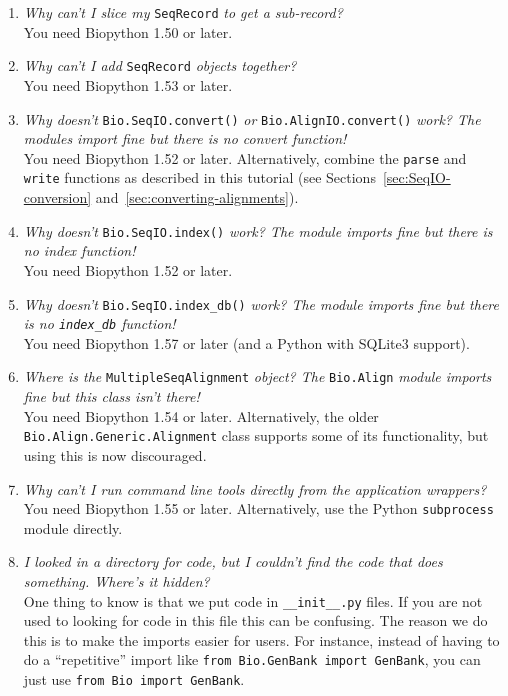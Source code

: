\begin{enumerate}
 \item \emph{Why can't I slice my} \verb|SeqRecord| \emph{to get a sub-record?} \\
  You need Biopython 1.50 or later.

 \item \emph{Why can't I add} \verb|SeqRecord| \emph{objects together?} \\
  You need Biopython 1.53 or later.

  \item \emph{Why doesn't} \verb|Bio.SeqIO.convert()| \emph{or} \verb|Bio.AlignIO.convert()| \emph{work? The modules import fine but there is no convert function!} \\
  You need Biopython 1.52 or later. Alternatively, combine the \verb|parse| and \verb|write|
  functions as described in this tutorial (see Sections~\ref{sec:SeqIO-conversion} and~\ref{sec:converting-alignments}).

  \item \emph{Why doesn't} \verb|Bio.SeqIO.index()| \emph{work? The module imports fine but there is no index function!} \\
  You need Biopython 1.52 or later.

  \item \emph{Why doesn't} \verb|Bio.SeqIO.index_db()| \emph{work? The module imports fine but there is no \texttt{index\_db} function!} \\
  You need Biopython 1.57 or later (and a Python with SQLite3 support).

  \item \emph{Where is the} \verb|MultipleSeqAlignment| \emph{object? The} \verb|Bio.Align| \emph{module imports fine but this class isn't there!} \\
  You need Biopython 1.54 or later. Alternatively, the older \verb|Bio.Align.Generic.Alignment| class supports some of its functionality, but using this is now discouraged.

  \item \emph{Why can't I run command line tools directly from the application wrappers?} \\
  You need Biopython 1.55 or later. Alternatively, use the Python \verb|subprocess| module directly.

  \item \emph{I looked in a directory for code, but I couldn't find the code that does something. Where's it hidden?} \\
  One thing to know is that we put code in \verb|__init__.py| files. If you are not used to looking for code in this file this can be confusing. The reason we do this is to make the imports easier for users. For instance, instead of having to do a ``repetitive'' import like \verb|from Bio.GenBank import GenBank|, you can just use \verb|from Bio import GenBank|.


\end{enumerate}
